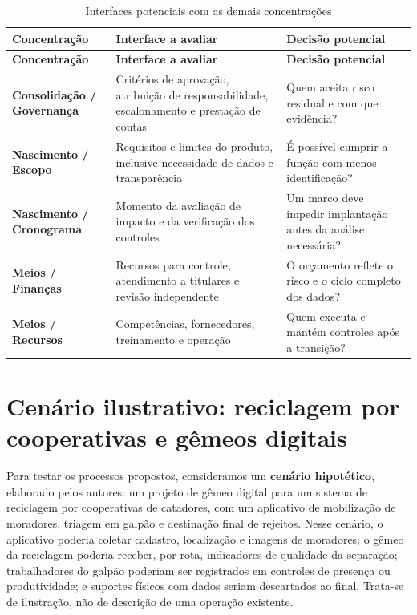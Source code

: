 \documentclass[11pt,a4paper]{article}
\newcommand{\SingleSpacing}{}
\newcommand{\fontetab}[1]{\par\vspace{3pt}{\small\noindent Fonte: #1\par}}
\begin{document}
\begingroup\SingleSpacing\small
\begin{longtable}{@{}>{\raggedright\arraybackslash}p{}>{\raggedright\arraybackslash}p{}>{\raggedright\arraybackslash}p{}@{}}
\caption{Interfaces potenciais com as demais concentrações}\label{tab:t11}\\
\toprule
\textbf{Concentração} & \textbf{Interface a avaliar} & \textbf{Decisão potencial}\\
\midrule
\endfirsthead
\toprule
\textbf{Concentração} & \textbf{Interface a avaliar} & \textbf{Decisão potencial}\\
\midrule
\endhead
\bottomrule
\endfoot
\bottomrule
\endlastfoot
\textbf{Consolidação / Governança} & Critérios de aprovação, atribuição de responsabilidade, escalonamento e prestação de contas & Quem aceita risco residual e com que evidência?\\[3pt]
\textbf{Nascimento / Escopo} & Requisitos e limites do produto, inclusive necessidade de dados e transparência & É possível cumprir a função com menos identificação?\\[3pt]
\textbf{Nascimento / Cronograma} & Momento da avaliação de impacto e da verificação dos controles & Um marco deve impedir implantação antes da análise necessária?\\[3pt]
\textbf{Meios / Finanças} & Recursos para controle, atendimento a titulares e revisão independente & O orçamento reflete o risco e o ciclo completo dos dados?\\[3pt]
\textbf{Meios / Recursos} & Competências, fornecedores, treinamento e operação & Quem executa e mantém controles após a transição?\\[3pt]
\end{longtable}
\endgroup
\fontetab{Elaborado pelos autores (2026).}

\section{Cenário ilustrativo: reciclagem por cooperativas e gêmeos digitais}

Para testar os processos propostos, consideramos um \textbf{cenário hipotético}, elaborado pelos autores: um projeto de gêmeo digital para um sistema de reciclagem por cooperativas de catadores, com um aplicativo de mobilização de moradores, triagem em galpão e destinação final de rejeitos. Nesse cenário, o aplicativo poderia coletar cadastro, localização e imagens de moradores; o gêmeo da reciclagem poderia receber, por rota, indicadores de qualidade da separação; trabalhadores do galpão poderiam ser registrados em controles de presença ou produtividade; e suportes físicos com dados seriam descartados ao final. Trata-se de ilustração, não de descrição de uma operação existente.
\end{document}
